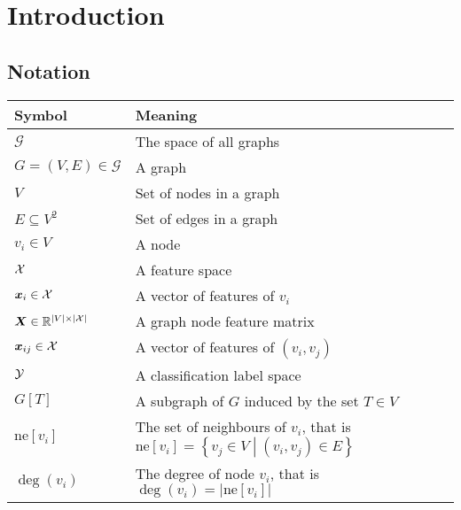 \chapter{Introduction}

\section{Notation}

\begin{tabular}{ll}
	\toprule
	\textbf{Symbol} & \textbf{Meaning} \\
	\midrule
	\( \mathcal{G} \) & The space of all graphs \\
	\( G = \left( V, E \right) \in \mathcal{G} \) & A graph \\
	\( V \) & Set of nodes in a graph \\
	\( E \subseteq V^2 \) & Set of edges in a graph \\
	\( v_i \in V \) & A node \\
	\( \mathcal{X} \) & A feature space \\
	\( \bm{x}_i \in \mathcal{X} \) & A vector of features of \( v_i \) \\
	\( \bm{X} \in \mathbb{R}^{\left\lvert V \right\rvert \times \left\lvert \mathcal{X} \right\rvert} \) & A graph node feature matrix	\\
	\( \bm{x}_{ij} \in \mathcal{X} \) & A vector of features of \( \left( v_i, v_j \right) \) \\
	\( \mathcal{Y} \) & A classification label space \\
	\( G \left[ T \right] \) & A subgraph of \( G \) induced by the set \( T \in V \) \\
	\( \mathrm{ne}[v_i] \) & The set of neighbours of \( v_i \), that is \( \mathrm{ne}[v_i] = \left\{ v_j \in V \middle| \left( v_i, v_j \right) \in E \right\} \) \\
	\( \deg \left( v_i \right) \) & The degree of node \( v_i \), that is \( \deg \left( v_i \right) = \left\lvert \mathrm{ne}[v_i] \right\rvert \) \\
	\bottomrule
\end{tabular}
